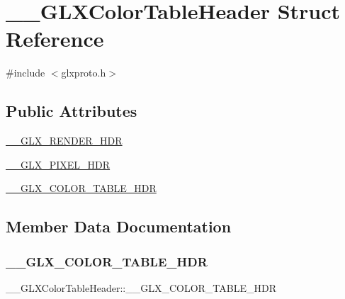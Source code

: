\hypertarget{struct_____g_l_x_color_table_header}{}\section{\+\_\+\+\_\+\+G\+L\+X\+Color\+Table\+Header Struct Reference}
\label{struct_____g_l_x_color_table_header}


{\ttfamily \#include $<$glxproto.\+h$>$}

\subsection*{Public Attributes}
\begin{DoxyCompactItemize}
\item 
\hyperlink{struct_____g_l_x_color_table_header_a7b6fa1bbab9d8a409df4d8d43b850812}{\+\_\+\+\_\+\+G\+L\+X\+\_\+\+R\+E\+N\+D\+E\+R\+\_\+\+H\+DR}
\item 
\hyperlink{struct_____g_l_x_color_table_header_a40263c6c1be570f4b62c4997e22605ed}{\+\_\+\+\_\+\+G\+L\+X\+\_\+\+P\+I\+X\+E\+L\+\_\+\+H\+DR}
\item 
\hyperlink{struct_____g_l_x_color_table_header_a8bf5187f117fef20bc86b9d0db06fd0f}{\+\_\+\+\_\+\+G\+L\+X\+\_\+\+C\+O\+L\+O\+R\+\_\+\+T\+A\+B\+L\+E\+\_\+\+H\+DR}
\end{DoxyCompactItemize}


\subsection{Member Data Documentation}
\mbox{\label{struct_____g_l_x_color_table_header_a8bf5187f117fef20bc86b9d0db06fd0f}} 
\subsubsection{\texorpdfstring{\+\_\+\+\_\+\+G\+L\+X\+\_\+\+C\+O\+L\+O\+R\+\_\+\+T\+A\+B\+L\+E\+\_\+\+H\+DR}{\_\_GLX\_COLOR\_TABLE\_HDR}}
{\footnotesize\ttfamily \+\_\+\+\_\+\+G\+L\+X\+Color\+Table\+Header\+::\+\_\+\+\_\+\+G\+L\+X\+\_\+\+C\+O\+L\+O\+R\+\_\+\+T\+A\+B\+L\+E\+\_\+\+H\+DR}

